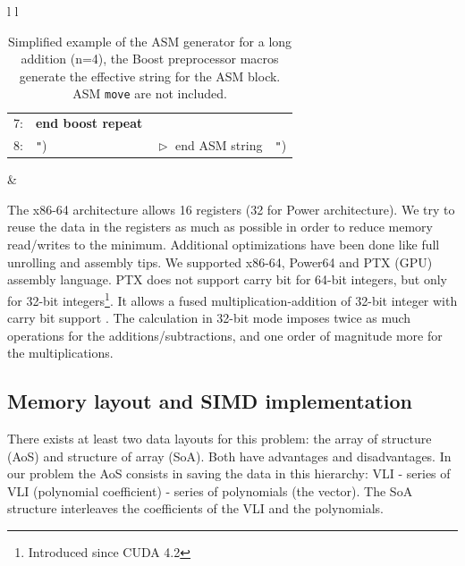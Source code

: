 \documentclass[oribibl]{llncs2e/llncs}
\begin{document}
\begin{table}[h]
\begin{center}
\begin{tabular}{l l}
\begin{tabular}{l l l l }
                               \tiny{7:} &  \textbf{end boost repeat} &  &   \\                            
                               \tiny{8:} &  \texttt{"})  &  $\vartriangleright$ end ASM string & \texttt{"})\\
                          \end{tabular} &  \\ \hline
		 \end{tabular} 
		 \caption{Simplified  example of the ASM generator for a long addition (n=4), the Boost preprocessor macros generate the effective string for the ASM block. ASM \texttt{move} are not included. \label{ASMGENERATOR}  }
	\end{center}
\end{table} 

The x86-64 architecture allows 16 registers (32 for Power architecture). We try to reuse the data in the registers as much as possible in order to reduce memory read/writes to the minimum.  Additional optimizations have been done like full unrolling and assembly tips. We  supported  x86-64, Power64 and PTX (GPU) assembly language.
 PTX does not support carry bit for 64-bit integers, but only for 32-bit integers\footnote{Introduced since CUDA 4.2}.  
It allows a fused multiplication-addition of 32-bit integer  with carry bit support \cite{CUDAasm}. 
The calculation in 32-bit mode imposes twice as much operations for the additions/subtractions, and one order of magnitude more for the multiplications. 

\subsection{Memory layout and SIMD implementation}

There exists at least two data layouts for this problem: the array of structure (AoS) and structure of array (SoA). Both have  advantages and disadvantages. In our problem the AoS consists in saving the data in this hierarchy: VLI - series of VLI (polynomial coefficient) - series of polynomials (the vector). The SoA structure interleaves the coefficients of the VLI and the polynomials.
\end{document}
